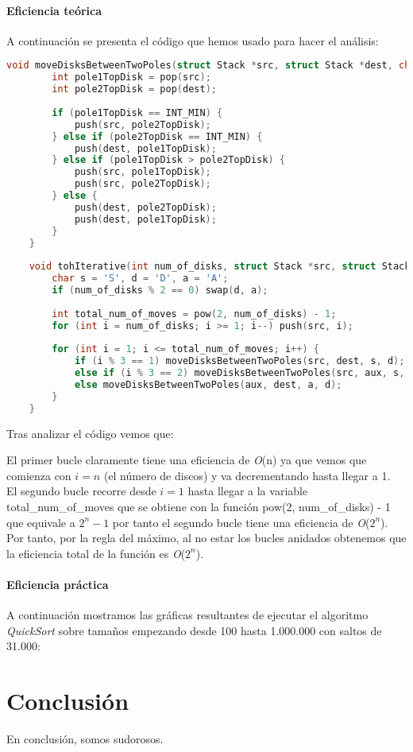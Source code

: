 \documentclass[a4paper,12pt]{article} %
\begin{document}
\paragraph{Eficiencia teórica}

A continuación se presenta el código que hemos usado para hacer el análisis:

\begin{lstlisting}[language=C, caption={Código de Hanoi Iterativo sin pila}]
	void moveDisksBetweenTwoPoles(struct Stack *src, struct Stack *dest, char s, char d) {
		int pole1TopDisk = pop(src);
		int pole2TopDisk = pop(dest);
	
		if (pole1TopDisk == INT_MIN) {
			push(src, pole2TopDisk);
		} else if (pole2TopDisk == INT_MIN) {
			push(dest, pole1TopDisk);
		} else if (pole1TopDisk > pole2TopDisk) {
			push(src, pole1TopDisk);
			push(src, pole2TopDisk);
		} else {
			push(dest, pole2TopDisk);
			push(dest, pole1TopDisk);
		}
	}
	
	void tohIterative(int num_of_disks, struct Stack *src, struct Stack *aux, struct Stack *dest) {
		char s = 'S', d = 'D', a = 'A';
		if (num_of_disks % 2 == 0) swap(d, a);
	
		int total_num_of_moves = pow(2, num_of_disks) - 1;
		for (int i = num_of_disks; i >= 1; i--) push(src, i);
	
		for (int i = 1; i <= total_num_of_moves; i++) {
			if (i % 3 == 1) moveDisksBetweenTwoPoles(src, dest, s, d);
			else if (i % 3 == 2) moveDisksBetweenTwoPoles(src, aux, s, a);
			else moveDisksBetweenTwoPoles(aux, dest, a, d);
		}
	}
\end{lstlisting}

Tras analizar el código vemos que:

El primer bucle claramente tiene una eficiencia de \textit{O}(n) ya que vemos que comienza con $i=n$ (el número de discos)
y va decrementando hasta llegar a 1.\\

El segundo bucle recorre desde $i=1$ hasta llegar a la variable total\_num\_of\_moves que se obtiene con la función 
pow(2, num\_of\_disks) - 1 que equivale a $2^n - 1$ por tanto el segundo bucle tiene una eficiencia de \textit{O}($2^n$).\\

Por tanto, por la regla del máximo, al no estar los bucles anidados obtenemos que la eficiencia total de la función es \textit{O}($2^n$).\\

\paragraph{Eficiencia práctica}

A continuación mostramos las gráficas resultantes de ejecutar el algoritmo \textit{QuickSort} 
sobre tamaños empezando desde 100 hasta 1.000.000 con saltos de 31.000:

\section{Conclusión}
En conclusión, somos sudorosos.
\end{document}
